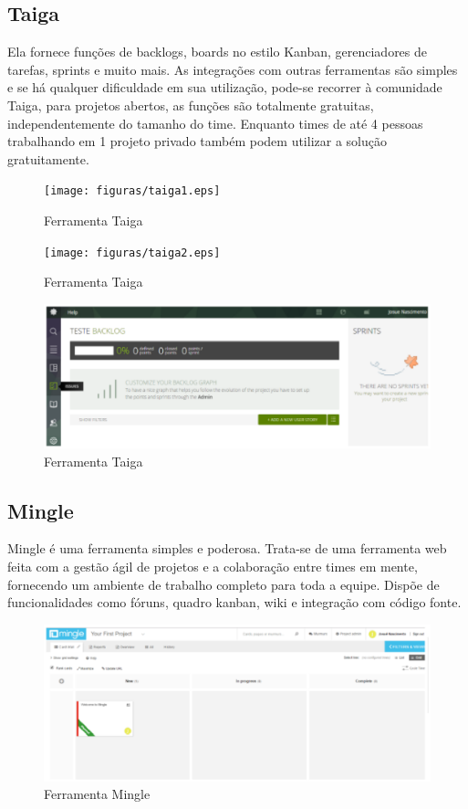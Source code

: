 	 \subsection{Taiga}
	 Ela fornece funções de backlogs, boards no estilo Kanban, gerenciadores de tarefas, sprints e muito mais. As integrações
	 com outras ferramentas são simples e se há qualquer dificuldade em sua utilização, pode-se recorrer à comunidade Taiga,
	 para projetos abertos, as funções são totalmente gratuitas, independentemente do tamanho do time. Enquanto times de até
	 4 pessoas trabalhando em 1 projeto privado também podem utilizar a solução gratuitamente.

	 \begin{figure}[!h]
	   \centering
	   \texttt{[image: figuras/taiga1.eps]}
	   \caption{Ferramenta Taiga}
	   \label{fig10}
	 \end{figure}

	 \begin{figure}[!h]
		 \centering
		 \texttt{[image: figuras/taiga2.eps]}
		 \caption{Ferramenta Taiga}
		 \label{fig11}
	 \end{figure}

	 \begin{figure}[!h]
		 \centering
		 \includegraphics[keepaspectratio=true,scale=0.9]{figuras/taiga3.eps}
		 \caption{Ferramenta Taiga}
		 \label{fig12}
	 \end{figure}

 \subsection{Mingle}
	 Mingle é uma ferramenta simples e poderosa. Trata-se de uma ferramenta web feita com a gestão ágil de projetos e a
	 colaboração entre times em mente, fornecendo um ambiente de trabalho completo para toda a equipe. Dispõe de funcionalidades
	  como fóruns, quadro kanban, wiki e integração com código fonte.

	\begin{figure}[!h]
 		 \centering
 		 \includegraphics[keepaspectratio=true,scale=0.59]{figuras/mingle1.eps}
 		 \caption{Ferramenta Mingle}
 		 \label{fig13}
 	\end{figure}

